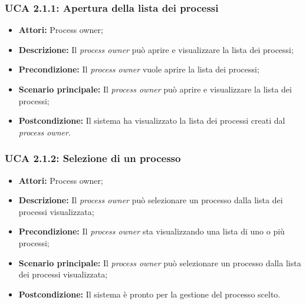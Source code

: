 \hypertarget{A2.1.1}{}
\subsubsection{UCA 2.1.1: Apertura della lista dei processi}
\begin{itemize}
\item \textbf{Attori:} Process owner;
\item \textbf{Descrizione:} Il \textit{process owner} può aprire e visualizzare la lista dei processi;
\item \textbf{Precondizione:} Il \textit{process owner} vuole aprire la lista dei processi;\\
\item \textbf{Scenario principale:} Il \textit{process owner} può aprire e visualizzare la lista dei processi;
\item \textbf{Postcondizione:} Il sistema ha visualizzato la lista dei processi creati dal \textit{process owner}.
\end{itemize}

\hypertarget{A2.1.2}{}
\subsubsection{UCA 2.1.2: Selezione di un processo}
\begin{itemize}
\item \textbf{Attori:} Process owner;
\item \textbf{Descrizione:} Il \textit{process owner} può selezionare un processo dalla lista dei processi visualizzata;
\item \textbf{Precondizione:} Il \textit{process owner} sta visualizzando una lista di uno o più processi;
\item \textbf{Scenario principale:} Il \textit{process owner} può selezionare un processo dalla lista dei processi visualizzata;
\item \textbf{Postcondizione:} Il sistema è pronto per la gestione del processo scelto.
\end{itemize}

